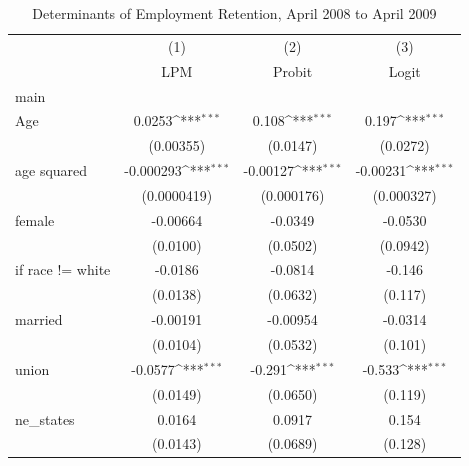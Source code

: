 \begin{table}[htbp]\centering
\def\sym#1{\ifmmode^{#1}\else\(^{#1}\)\fi}
\caption{Determinants of Employment Retention, April 2008 to April 2009\label{tab:prob1-full}}
\footnotesize
\renewcommand{\arraystretch}{0.9}
\begin{tabular}{l*{3}{c}}
\toprule
                    &\multicolumn{1}{c}{(1)}&\multicolumn{1}{c}{(2)}&\multicolumn{1}{c}{(3)}\\
                    &\multicolumn{1}{c}{LPM}&\multicolumn{1}{c}{Probit}&\multicolumn{1}{c}{Logit}\\
\midrule
main                &                     &                     &                     \\
Age                 &      0.0253\sym{***}&       0.108\sym{***}&       0.197\sym{***}\\
                    &   (0.00355)         &    (0.0147)         &    (0.0272)         \\
\addlinespace
age squared         &   -0.000293\sym{***}&    -0.00127\sym{***}&    -0.00231\sym{***}\\
                    & (0.0000419)         &  (0.000176)         &  (0.000327)         \\
\addlinespace
female              &    -0.00664         &     -0.0349         &     -0.0530         \\
                    &    (0.0100)         &    (0.0502)         &    (0.0942)         \\
\addlinespace
=1 if race != white &     -0.0186         &     -0.0814         &      -0.146         \\
                    &    (0.0138)         &    (0.0632)         &     (0.117)         \\
\addlinespace
married             &    -0.00191         &    -0.00954         &     -0.0314         \\
                    &    (0.0104)         &    (0.0532)         &     (0.101)         \\
\addlinespace
union               &     -0.0577\sym{***}&      -0.291\sym{***}&      -0.533\sym{***}\\
                    &    (0.0149)         &    (0.0650)         &     (0.119)         \\
\addlinespace
ne\_states           &      0.0164         &      0.0917         &       0.154         \\
                    &    (0.0143)         &    (0.0689)         &     (0.128)         \\

\end{tabular}
\end{table}
